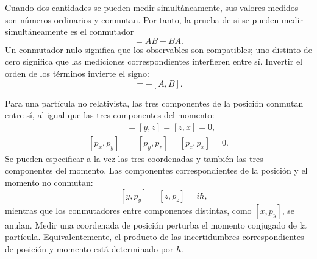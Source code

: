 Cuando dos cantidades se pueden medir simultáneamente, sus valores medidos son números ordinarios y conmutan. Por tanto, la prueba de si se pueden medir simultáneamente es el conmutador
\begin{equation}
[A,B]=AB-BA.
\end{equation}
Un conmutador nulo significa que los observables son compatibles; uno distinto de cero significa que las mediciones correspondientes interfieren entre sí. Invertir el orden de los términos invierte el signo:
\begin{equation}
[B,A]=-[A,B].
\end{equation}

Para una partícula no relativista, las tres componentes de la posición conmutan entre sí, al igual que las tres componentes del momento:
\begin{align}
[x,y]&=[y,z]=[z,x]=0,\\
[p_x,p_y]&=[p_y,p_z]=[p_z,p_x]=0.
\end{align}
Se pueden especificar a la vez las tres coordenadas y también las tres componentes del momento. Las componentes correspondientes de la posición y el momento no conmutan:
\begin{equation}
[x,p_x]=[y,p_y]=[z,p_z]=i\hbar,
\end{equation}
mientras que los conmutadores entre componentes distintas, como \([x,p_y]\), se anulan. Medir una coordenada de posición perturba el momento conjugado de la partícula. Equivalentemente, el producto de las incertidumbres correspondientes de posición y momento está determinado por \(\hbar\).

\begin{classroomqa}
\end{classroomqa}

\begin{classroomqa}
\end{classroomqa}

